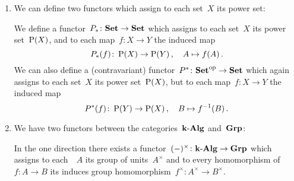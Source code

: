 \begin{example}
  \label{examples for functors}
  \leavevmode
  \begin{enumerate}
    \item
      We can define two functors which assign to each set~$X$ its power set:
      
      We define a functor~$P_* \colon \mathbf{Set} \to \mathbf{Set}$ which assigns to each set~$X$ its power set~$\operatorname{P}(X)$, and to each map~$f \colon X \to Y$ the induced map
      \[
                P_*(f)
        \colon  \operatorname{P}(X)
        \to     \operatorname{P}(Y) \,,
        \quad   A
        \mapsto f(A) \,.
      \]
      We can also define a (contravariant) functor~$P^* \colon \mathbf{Set}^{\mathrm{op}} \to \mathbf{Set}$ which again assigns to each set~$X$ its power set~$\operatorname{P}(X)$, but to each map~$f \colon X \to Y$ the induced map
      \[
                P^*(f)
        \colon  \operatorname{P}(Y)
        \to     \operatorname{P}(X) \,,
        \quad   B
        \mapsto f^{-1}(B) \,.
      \]
    \item
      We have two functors between the categories~$\text{$\mathbf{k}$-$\mathbf{Alg}$}$ and~$\mathbf{Grp}$:
      
      In the one direction there exists a functor~$(-)^\times \colon \text{$\mathbf{k}$-$\mathbf{Alg}$} \to \mathbf{Grp}$ which assigns to each~{\kalg}~$A$ its group of units~$A^\times$ and to every homomorphism of~{\kalgs}~$f \colon A \to B$ its induces group homomorphism~$f^\times \colon A^\times \to B^\times$.
      

\end{enumerate}
\end{example}
